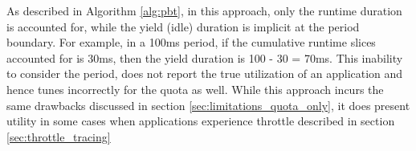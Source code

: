 As described in Algorithm \ref{alg:pbt}, in this approach, only the runtime duration is accounted for, while the yield (idle) duration is implicit at the period boundary. For example, in a 100ms period, if the cumulative runtime slices accounted for is 30ms, then the yield duration is 100 - 30 = 70ms. This inability to consider the period, does not report the true utilization of an application and hence tunes incorrectly for the quota as well. While this approach incurs the same drawbacks discussed in section \ref{sec:limitations_quota_only}, it does present utility in some cases when applications experience throttle described in section \ref{sec:throttle_tracing}






